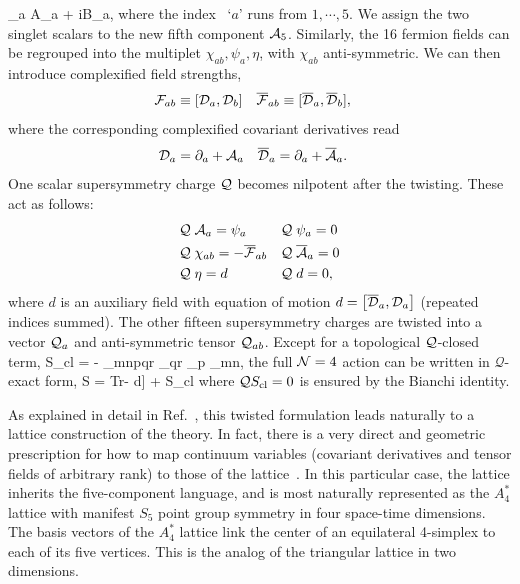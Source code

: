 \beq
  \label{5dgauge}
  \cA_a \equiv A_a + iB_a,
\eeq
where the index ~`$a$' runs from $1, \cdots, 5$.
We assign the two singlet scalars to the new fifth component $\mathcal A_5$.
Similarly, the 16 fermion fields can be regrouped into the multiplet $\chi_{ab}, \psi_a, \eta$, with $\chi_{ab}$ anti-symmetric.
We can then introduce complexified field strengths,
\begin{align}
  {\cal F}_{ab} & \equiv [\mathcal D_a, \mathcal D_b] &
  {\overline{\cal F}}_{ab} & \equiv [{\overline{\cal D}}_a, {\overline{\cal D}}_b],
\end{align}
where the corresponding complexified covariant derivatives read
\begin{align}
  \mathcal D_a & = \partial_a + \mathcal A_a &
  {\overline{\cal D}}_a & = \partial_a + \overline{\mathcal A}_a.
\end{align}
One scalar supersymmetry charge $\mathcal Q$ becomes nilpotent after the twisting.
These act as follows:
\begin{align}
  & \mathcal Q\; \mathcal A_a = \psi_a         & & \mathcal Q\; \psi_a = 0                       \cr
  & \mathcal Q\; \chi_{ab} = -{\overline{\cal F}}_{ab} & & \mathcal Q\; \overline{\mathcal A}_a = 0 \label{BRSTsymmetry}  \\
  & \mathcal Q\; \eta = d               & & \mathcal Q\; d = 0,                           \nonumber
\end{align}
where $d$ is an auxiliary field with equation of motion $d = \left[{\overline{\cal D}}_a, \mathcal D_a\right]$ (repeated indices summed).
The other fifteen supersymmetry charges are twisted into a vector $\mathcal Q_a$ and anti-symmetric tensor $\mathcal Q_{ab}$.
Except for a topological $\mathcal Q$-closed term,
\beq
  \label{closed}
  S_{\rm cl} = - \int \Tr \epsilon_{mnpqr} \chi_{qr} \cDb_p \chi_{mn},
\eeq
the full $\mathcal N = 4$ action can be written in $\mathcal{Q}$-exact form, 
\beq
  \label{4daction}
  S =  \cQ \int \mbox{Tr}\left[\chi_{ab}\cF_{ab} + \eta [ \cDb_a,\cD_a ] - \eta d\right] + S_{\rm cl}
\eeq
where $\mathcal{Q} S_{\rm cl} = 0$ is ensured by the Bianchi identity.

As explained in detail in Ref.~\cite{Catterall:2007kn}, this twisted formulation leads naturally to a lattice construction of the theory.
In fact, there is a very direct and geometric prescription for how to map continuum variables 
(covariant derivatives and tensor fields of arbitrary rank) to those of the 
lattice~\cite{Catterall:2007kn, Damgaard:2008pa}.
In this particular case, the lattice inherits the five-component language, and is most 
naturally represented as the $A_4^*$ lattice with manifest $S_5$ point group symmetry 
in four space-time dimensions.
The basis vectors of the $A_4^*$ lattice link the center of an equilateral 4-simplex to each of its five vertices.
This is the analog of the triangular lattice in two dimensions. 

